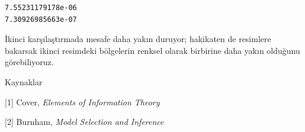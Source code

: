 \documentclass[12pt,fleqn]{article}\usepackage{../../common}
\begin{document}
\begin{verbatim}
7.55231179178e-06
7.30926985663e-07
\end{verbatim}

İkinci karşılaştırmada mesafe daha yakın duruyor; hakikaten de resimlere
bakarsak ikinci resimdeki bölgelerin renksel olarak birbirine daha yakın
olduğunu görebiliyoruz.

Kaynaklar

[1] Cover, {\em Elements of Information Theory}

[2] Burnham, {\em Model Selection and Inference}
\end{document}
